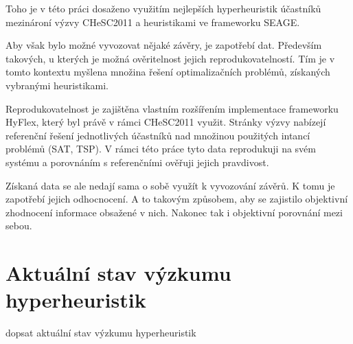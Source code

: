 
Toho je v této práci dosaženo využitím nejlepších hyperheuristik účastníků mezinároní výzvy CHeSC2011 a heuristikami ve frameworku SEAGE.


Aby však bylo možné vyvozovat nějaké závěry, je zapotřebí dat. Především takových, u kterých je možná ověritelnost jejich reprodukovatelností. Tím je v tomto kontextu myšlena množina řešení optimalizačních problémů, získaných vybranými heuristikami.

Reprodukovatelnost je zajištěna vlastním rozšířením implementace frameworku HyFlex, který byl právě v rámci CHeSC2011 využit. Stránky výzvy nabízejí referenční řešení jednotlivých účastníků nad množinou použitých intancí problémů (SAT, TSP). V rámci této práce tyto data reprodukuji na svém systému a porovnáním s referenčními ověřuji jejich pravdivost. 

Získaná data se ale nedají sama o sobě využít k vyvozování závěrů. K tomu je zapotřebí jejich odhocnocení. A to takovým způsobem, aby se zajistilo objektivní zhodnocení informace obsažené v nich. Nakonec tak i objektivní porovnání mezi sebou.




\section{Aktuální stav výzkumu hyperheuristik}

dopsat aktuální stav výzkumu hyperheuristik
\cite{DRAKE2020405}
